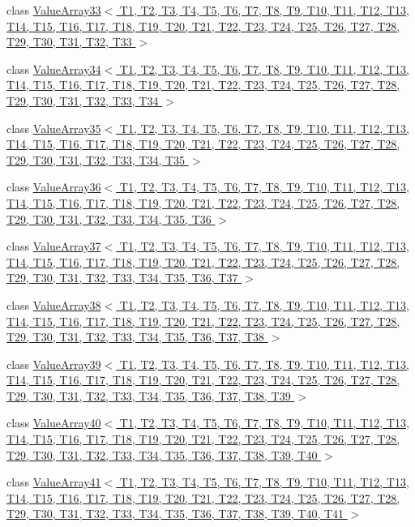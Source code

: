 \begin{DoxyCompactItemize}
\item 
class \hyperlink{classtesting_1_1internal_1_1ValueArray33}{\-Value\-Array33$<$ T1, T2, T3, T4, T5, T6, T7, T8, T9, T10, T11, T12, T13, T14, T15, T16, T17, T18, T19, T20, T21, T22, T23, T24, T25, T26, T27, T28, T29, T30, T31, T32, T33 $>$}
\item 
class \hyperlink{classtesting_1_1internal_1_1ValueArray34}{\-Value\-Array34$<$ T1, T2, T3, T4, T5, T6, T7, T8, T9, T10, T11, T12, T13, T14, T15, T16, T17, T18, T19, T20, T21, T22, T23, T24, T25, T26, T27, T28, T29, T30, T31, T32, T33, T34 $>$}
\item 
class \hyperlink{classtesting_1_1internal_1_1ValueArray35}{\-Value\-Array35$<$ T1, T2, T3, T4, T5, T6, T7, T8, T9, T10, T11, T12, T13, T14, T15, T16, T17, T18, T19, T20, T21, T22, T23, T24, T25, T26, T27, T28, T29, T30, T31, T32, T33, T34, T35 $>$}
\item 
class \hyperlink{classtesting_1_1internal_1_1ValueArray36}{\-Value\-Array36$<$ T1, T2, T3, T4, T5, T6, T7, T8, T9, T10, T11, T12, T13, T14, T15, T16, T17, T18, T19, T20, T21, T22, T23, T24, T25, T26, T27, T28, T29, T30, T31, T32, T33, T34, T35, T36 $>$}
\item 
class \hyperlink{classtesting_1_1internal_1_1ValueArray37}{\-Value\-Array37$<$ T1, T2, T3, T4, T5, T6, T7, T8, T9, T10, T11, T12, T13, T14, T15, T16, T17, T18, T19, T20, T21, T22, T23, T24, T25, T26, T27, T28, T29, T30, T31, T32, T33, T34, T35, T36, T37 $>$}
\item 
class \hyperlink{classtesting_1_1internal_1_1ValueArray38}{\-Value\-Array38$<$ T1, T2, T3, T4, T5, T6, T7, T8, T9, T10, T11, T12, T13, T14, T15, T16, T17, T18, T19, T20, T21, T22, T23, T24, T25, T26, T27, T28, T29, T30, T31, T32, T33, T34, T35, T36, T37, T38 $>$}
\item 
class \hyperlink{classtesting_1_1internal_1_1ValueArray39}{\-Value\-Array39$<$ T1, T2, T3, T4, T5, T6, T7, T8, T9, T10, T11, T12, T13, T14, T15, T16, T17, T18, T19, T20, T21, T22, T23, T24, T25, T26, T27, T28, T29, T30, T31, T32, T33, T34, T35, T36, T37, T38, T39 $>$}
\item 
class \hyperlink{classtesting_1_1internal_1_1ValueArray40}{\-Value\-Array40$<$ T1, T2, T3, T4, T5, T6, T7, T8, T9, T10, T11, T12, T13, T14, T15, T16, T17, T18, T19, T20, T21, T22, T23, T24, T25, T26, T27, T28, T29, T30, T31, T32, T33, T34, T35, T36, T37, T38, T39, T40 $>$}
\item 
class \hyperlink{classtesting_1_1internal_1_1ValueArray41}{\-Value\-Array41$<$ T1, T2, T3, T4, T5, T6, T7, T8, T9, T10, T11, T12, T13, T14, T15, T16, T17, T18, T19, T20, T21, T22, T23, T24, T25, T26, T27, T28, T29, T30, T31, T32, T33, T34, T35, T36, T37, T38, T39, T40, T41 $>$}

\end{DoxyCompactItemize}
